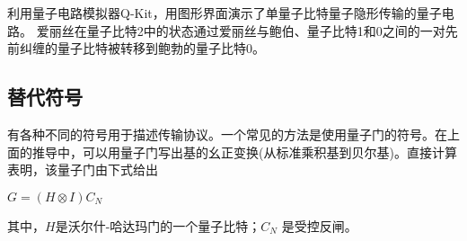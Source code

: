 利用量子电路模拟器Q-Kit，用图形界面演示了单量子比特量子隐形传输的量子电路。 爱丽丝在量子比特2中的状态通过爱丽丝与鲍伯、量子比特1和0之间的一对先前纠缠的量子比特被转移到鲍勃的量子比特0。

\subsection{替代符号}

有各种不同的符号用于描述传输协议。一个常见的方法是使用量子门的符号。在上面的推导中，可以用量子门写出基的幺正变换(从标准乘积基到贝尔基)。直接计算表明，该量子门由下式给出

$G=(H\otimes I)C_N$

其中，$H$是沃尔什-哈达玛门的一个量子比特；$C_N$ 是受控反闸。
